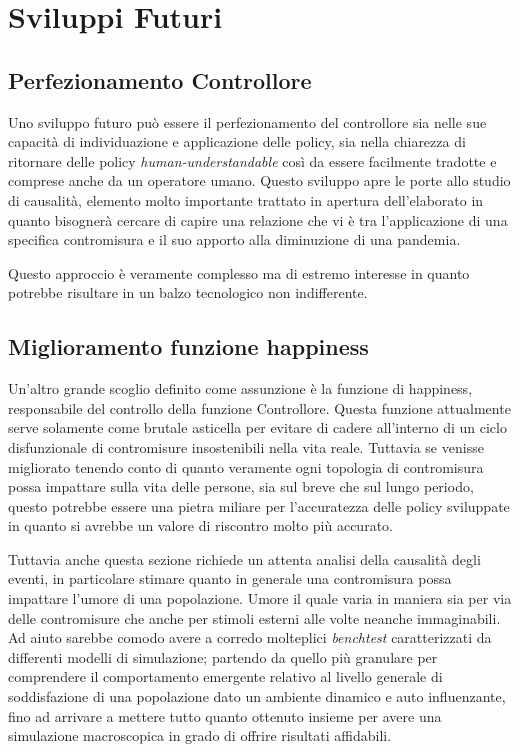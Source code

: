 \section{Sviluppi Futuri}
\subsection{Perfezionamento Controllore}
Uno sviluppo futuro può essere il perfezionamento del controllore sia nelle sue capacità di individuazione
e applicazione delle policy, sia nella chiarezza di ritornare delle policy \emph{human-understandable} così 
da essere facilmente tradotte e comprese anche da un operatore umano. Questo sviluppo apre le porte allo studio 
di causalità, elemento molto importante trattato in apertura dell'elaborato in quanto bisognerà cercare di capire 
una relazione che vi è tra l'applicazione di una specifica contromisura e il suo apporto alla diminuzione di una 
pandemia. 

Questo approccio è veramente complesso ma di estremo interesse in quanto potrebbe risultare in un balzo 
tecnologico non indifferente. 

\subsection{Miglioramento funzione happiness}
Un'altro grande scoglio definito come assunzione è la funzione di happiness, responsabile del 
controllo della funzione Controllore. Questa funzione attualmente serve solamente come brutale asticella per evitare 
di cadere all'interno di un ciclo disfunzionale di contromisure insostenibili nella vita reale. Tuttavia 
se venisse migliorato tenendo conto di quanto veramente ogni topologia di contromisura possa impattare sulla vita 
delle persone, sia sul breve che sul lungo periodo, questo potrebbe essere una pietra miliare per l'accuratezza delle 
policy sviluppate in quanto si avrebbe un valore di riscontro molto più accurato. 

Tuttavia anche questa sezione richiede un attenta analisi della causalità degli eventi, in particolare stimare quanto in 
generale una contromisura possa impattare l'umore di una popolazione. Umore il quale varia in maniera sia per via delle contromisure 
che anche per stimoli esterni alle volte neanche immaginabili. Ad aiuto sarebbe comodo avere a corredo molteplici \emph{benchtest} caratterizzati 
da differenti modelli di simulazione; partendo da quello più granulare per comprendere il comportamento emergente relativo 
al livello generale di soddisfazione di una popolazione dato un ambiente dinamico e auto influenzante, fino ad arrivare a mettere 
tutto quanto ottenuto insieme per avere una simulazione macroscopica in grado di offrire risultati affidabili.

